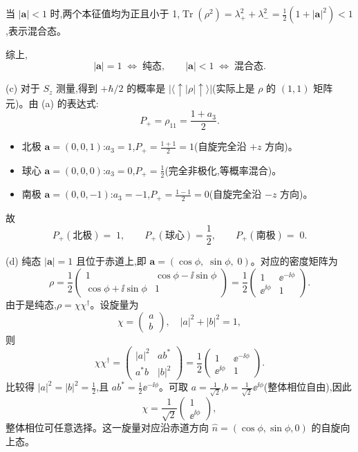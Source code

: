 \begin{question}
\begin{solution}
当 $|\mathbf a| < 1$ 时,两个本征值均为正且小于 1,$\operatorname{Tr}(\rho^2) = \lambda_+^2 + \lambda_-^2 = \frac12(1+|\mathbf a|^2) < 1$,表示混合态。

综上,
\[
\boxed{|\mathbf a| = 1 \;\Longleftrightarrow\; \text{纯态},\qquad
|\mathbf a| < 1 \;\Longleftrightarrow\; \text{混合态}.}
\]

(c) 对于 $S_z$ 测量,得到 $+\hbar/2$ 的概率是 $|\langle\uparrow|\rho|\uparrow\rangle|$(实际上是 $\rho$ 的 $(1,1)$ 矩阵元)。由 (a) 的表达式:
\[
P_+ = \rho_{11} = \frac{1+a_3}{2}.
\]
\begin{itemize}
\item 北极 $\mathbf a = (0,0,1)$:$a_3 = 1$,$P_+ = \frac{1+1}{2} = 1$(自旋完全沿 $+z$ 方向)。
\item 球心 $\mathbf a = (0,0,0)$:$a_3 = 0$,$P_+ = \frac{1}{2}$(完全非极化,等概率混合)。
\item 南极 $\mathbf a = (0,0,-1)$:$a_3 = -1$,$P_+ = \frac{1-1}{2} = 0$(自旋完全沿 $-z$ 方向)。
\end{itemize}
故
\[
\boxed{P_+(\text{北极})=\;1,\qquad P_+(\text{球心})=\frac12,\qquad P_+(\text{南极})=\;0.}
\]

(d) 纯态 $|\mathbf a|=1$ 且位于赤道上,即 $\mathbf a = (\cos\phi,\;\sin\phi,\;0)$。对应的密度矩阵为
\[
\rho = \frac12\begin{pmatrix}
1 & \cos\phi - \ii\sin\phi\\
\cos\phi + \ii\sin\phi & 1
\end{pmatrix}
= \frac12\begin{pmatrix}
1 & \ee^{-\ii\phi}\\
\ee^{\ii\phi} & 1
\end{pmatrix}.
\]
由于是纯态,$\rho = \chi\chi^\dagger$。设旋量为
\[
\chi = \begin{pmatrix}a\\b\end{pmatrix},\quad |a|^2+|b|^2=1,
\]
则
\[
\chi\chi^\dagger = \begin{pmatrix}|a|^2 & ab^*\\ a^*b & |b|^2\end{pmatrix}
= \frac12\begin{pmatrix}1 & \ee^{-\ii\phi}\\ \ee^{\ii\phi} & 1\end{pmatrix}.
\]
比较得 $|a|^2 = |b|^2 = \frac12$,且 $ab^* = \frac12 \ee^{-\ii\phi}$。可取 $a = \frac{1}{\sqrt{2}}$,$b = \frac{1}{\sqrt{2}}\ee^{\ii\phi}$(整体相位自由),因此
\[
\boxed{\chi = \frac{1}{\sqrt{2}}\begin{pmatrix}1\\ \ee^{\ii\phi}\end{pmatrix},}
\]
整体相位可任意选择。这一旋量对应沿赤道方向 $\hat n = (\cos\phi,\sin\phi,0)$ 的自旋向上态。
\end{solution}
\end{question}
